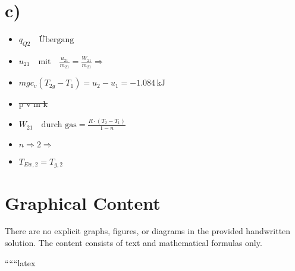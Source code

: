 \section*{c)}
\begin{itemize}
    \item $q_{Q2} \quad \text{Übergang}$
    \item $u_{21} \quad \text{mit} \quad \frac{u_{21}}{m_{21}} = \frac{W_{21}}{m_{21}} \Rightarrow$
    \item $m g c_v (T_{2g} - T_1) = u_2 - u_1 = -1.084 \, \text{kJ}$
    \item \sout{p \cdot v \cdot m \cdot k}
    \item $W_{21} \quad \text{durch gas} = \frac{R \cdot (T_2 - T_1)}{1 - n}$
    \item $n \Rightarrow 2 \Rightarrow$
    \item $T_{Ew,2} = T_{g,2}$
\end{itemize}

\section*{Graphical Content}
There are no explicit graphs, figures, or diagrams in the provided handwritten solution. The content consists of text and mathematical formulas only.

``````latex


